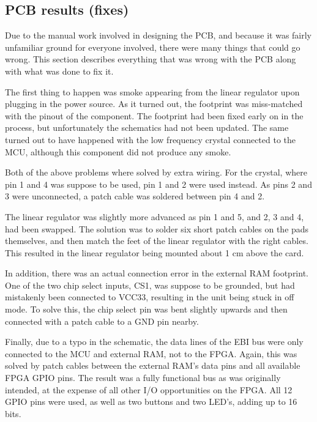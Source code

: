 
\subsection{PCB results (fixes)}

Due to the manual work involved in designing the PCB, and because it was fairly
unfamiliar ground for everyone involved, there were many things that could go
wrong. This section describes everything that was wrong with the PCB along with
what was done to fix it.

The first thing to happen was smoke appearing from the linear regulator upon
plugging in the power source. As it turned out, the footprint was miss-matched
with the pinout of the component. The footprint had been fixed early on in the
process, but unfortunately the schematics had not been updated. The same turned
out to have happened with the low frequency crystal connected to the MCU,
although this component did not produce any smoke.

Both of the above problems where solved by extra wiring. For the crystal, where
pin 1 and 4 was suppose to be used, pin 1 and 2 were used instead. As pins 2 and
3 were unconnected, a patch cable was soldered between pin 4 and 2.

The linear regulator was slightly more advanced as pin 1 and 5, and 2, 3 and 4,
had been swapped. The solution was to solder six short patch cables on the pads
themselves, and then match the feet of the linear regulator with the right
cables. This resulted in the linear regulator being mounted about 1 cm above the
card. 

In addition, there was an actual connection error in the external RAM footprint.
One of the two chip select inputs, CS1, was suppose to be grounded, but had
mistakenly been connected to VCC33, resulting in the unit being stuck in off
mode. To solve this, the chip select pin was bent slightly upwards and then
connected with a patch cable to a GND pin nearby. 

Finally, due to a typo in the schematic, the data lines of the EBI bus were only
connected to the MCU and external RAM, not to the FPGA. Again, this was solved
by patch cables between the external RAM's data pins and all available FPGA GPIO
pins. The result was a fully functional bus as was originally intended, at the
expense of all other I/O opportunities on the FPGA. All 12 GPIO pins were used,
as well as two buttons and two LED's, adding up to 16 bits.
